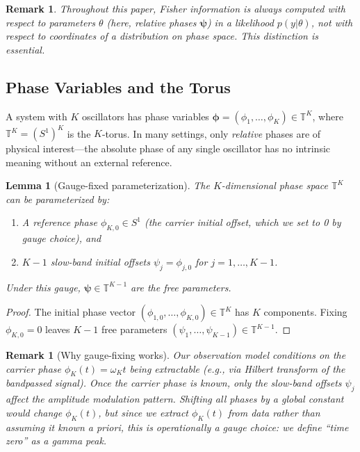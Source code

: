 \documentclass[12pt]{article}
\newtheorem{lemma}[theorem]{Lemma}
\newtheorem{remark}[theorem]{Remark}
\newcommand{\T}{\mathbb{T}}
\begin{document}
\begin{remark}
Throughout this paper, Fisher information is always computed with respect to \emph{parameters} $\theta$ (here, relative phases $\bm{\psi}$) in a likelihood $p(y|\theta)$, not with respect to coordinates of a distribution on phase space. This distinction is essential.
\end{remark}

\subsection{Phase Variables and the Torus}

A system with $K$ oscillators has phase variables $\bm{\phi} = (\phi_1, \ldots, \phi_K) \in \T^K$, where $\T^K = (S^1)^K$ is the $K$-torus. In many settings, only \emph{relative} phases are of physical interest---the absolute phase of any single oscillator has no intrinsic meaning without an external reference.

\begin{lemma}[Gauge-fixed parameterization]
\label{lem:torus}
The $K$-dimensional phase space $\T^K$ can be parameterized by:
\begin{enumerate}
    \item[(i)] A reference phase $\phi_{K,0} \in S^1$ (the carrier initial offset, which we set to 0 by gauge choice), and
    \item[(ii)] $K-1$ slow-band initial offsets $\psi_j = \phi_{j,0}$ for $j = 1, \ldots, K-1$.
\end{enumerate}
Under this gauge, $\bm{\psi} \in \T^{K-1}$ are the free parameters.
\end{lemma}

\begin{proof}
The initial phase vector $(\phi_{1,0}, \ldots, \phi_{K,0}) \in \T^K$ has $K$ components. Fixing $\phi_{K,0} = 0$ leaves $K-1$ free parameters $(\psi_1, \ldots, \psi_{K-1}) \in \T^{K-1}$.
\end{proof}

\begin{remark}[Why gauge-fixing works]
Our observation model conditions on the carrier phase $\phi_K(t) = \omega_K t$ being extractable (e.g., via Hilbert transform of the bandpassed signal). Once the carrier phase is known, only the slow-band offsets $\psi_j$ affect the amplitude modulation pattern. Shifting all phases by a global constant would change $\phi_K(t)$, but since we extract $\phi_K(t)$ from data rather than assuming it known \emph{a priori}, this is operationally a gauge choice: we define ``time zero'' as a gamma peak.
\end{remark}
\end{document}
